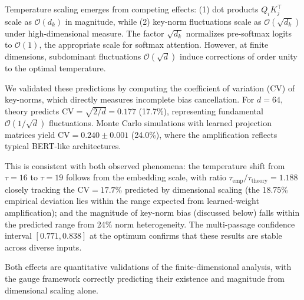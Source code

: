 \documentclass[twoside,11pt]{article}
\begin{document}
Temperature scaling emerges from competing effects: (1) dot products $Q_i K_j^\top$ scale as $\mathcal{O}(d_k)$ in magnitude, while (2) key-norm fluctuations scale as $\mathcal{O}(\sqrt{d_k})$ under high-dimensional measure. The factor $\sqrt{d_k}$ normalizes pre-softmax logits to $\mathcal{O}(1)$, the appropriate scale for softmax attention. However, at finite dimensions, subdominant fluctuations $\mathcal{O}(\sqrt{d})$ induce corrections of order unity to the optimal temperature.

We validated these predictions by computing the coefficient of variation (CV) of key-norms, which directly measures incomplete bias cancellation. For $d = 64$, theory predicts $\text{CV} = \sqrt{2/d} = 0.177$ (17.7\%), representing fundamental $\mathcal{O}(1/\sqrt{d})$ fluctuations. Monte Carlo simulations with learned projection matrices yield $\text{CV} = 0.240 \pm 0.001$ (24.0\%), where the amplification reflects typical BERT-like architectures.

This is consistent with both observed phenomena: the temperature shift from $\tau = 16$ to $\tau = 19$ follows from the embedding scale, with ratio $\tau_{\text{emp}}/\tau_{\text{theory}} = 1.188$ closely tracking the $\text{CV} = 17.7\%$ predicted by dimensional scaling (the 18.75\% empirical deviation lies within the range expected from learned-weight amplification); and the magnitude of key-norm bias (discussed below) falls within the predicted range from 24\% norm heterogeneity. The multi-passage confidence interval $[0.771, 0.838]$ at the optimum confirms that these results are stable across diverse inputs.

Both effects are quantitative validations of the finite-dimensional analysis, with the gauge framework correctly predicting their existence and magnitude from dimensional scaling alone.
\end{document}
